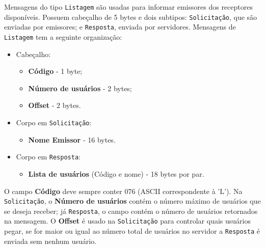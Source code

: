 \documentclass[12pt]{article}
\begin{document}
Mensagens do tipo {\tt Listagem} são usadas para informar emissores dos receptores disponíveis.
Possuem cabeçalho de 5 bytes e dois subtipos:
{\tt Solicitação}, que são enviadas por emissores;
e {\tt Resposta}, enviada por servidores.
Mensagens de {\tt Listagem} tem a seguinte organização:
\begin{itemize}
\item Cabeçalho:
	\begin{itemize}
	\item {\bf Código} - 1 byte;
	\item {\bf Número de usuários} - 2 bytes;
	\item {\bf Offset} - 2 bytes.
	\end{itemize}
\item Corpo em {\tt Solicitação}:
	\begin{itemize}
	\item {\bf Nome Emissor} - 16 bytes.
	\end{itemize}
\item Corpo em {\tt Resposta}:
	\begin{itemize}
	\item {\bf Lista de usuários} (Código e nome) - 18 bytes por par.
	\end{itemize}
\end{itemize}
O campo {\bf Código} deve sempre conter 076 (ASCII correspondente à 'L').
Na {\tt Solicitação}, o {\bf Número de usuários} contém o número máximo de usuários que se deseja receber;
já {\tt Resposta}, o campo contém o número de usuários retornados na mensagem.
O {\bf Offset} é usado na {\tt Solicitação} para controlar quais usuários pegar, se for maior ou igual ao número total de usuários no servidor a {\tt Resposta} é enviada sem nenhum usuário. 
\end{document}
